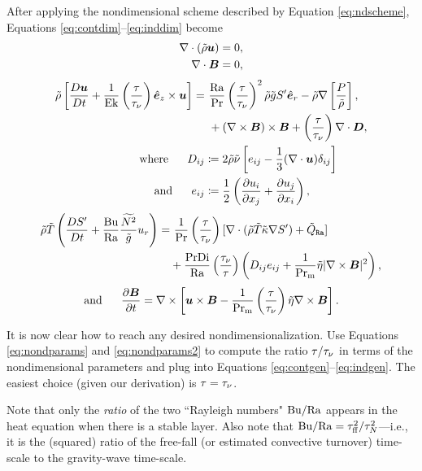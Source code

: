 \documentclass[12pt]{article}
\numberwithin{equation}{section}
\newcommand{\tauovertaunu}{\left(\frac{\tau}{\taunu}\right)}
\begin{document}
	After applying the nondimensional scheme described by Equation \eqref{eq:ndscheme}, Equations \eqref{eq:contdim}--\eqref{eq:inddim} become 
	\begin{align}
	\nabla\cdot(\tilde{\rho}\bm{u}) &= 0\label{eq:contnd},\\
	\nabla\cdot \bm{B} &= 0,
\end{align}
\begin{subequations}\label{eq:momnd}
	\begin{align}
		\rhotilde\left[\matderiv{\vecu}+\frac{1}{\ek}\tauovertaunu\ez\times\vecu\right] = &\ \frac{\ra}{\pr}\left(\frac{\tau}{\taunu}\right)^2\rhotilde\gtilde \entrprime\er         -\rhotilde\nabla\left[ \frac{P}{\rhotilde} \right], \nonumber\\
		&\ +(\curl\vecb)\times\vecb +\tauovertaunu\Div\bm{D},\\
		\where D_{ij} &\define 2\rhotilde\nutilde \left[e_{ij} - \frac{1}{3}(\Div\vecu) \delta_{ij} \right]\\
		\andd e_{ij} &\define \frac{1}{2}\left(\pderiv{u_i}{x_j} + \pderiv{u_j}{x_i} \right),
	\end{align}
\end{subequations}
\begin{align}\label{eq:ennd}
	\rhotilde\tmptilde\left( \matderiv{\entrprime} + \frac{\bu}{\ra}\frac{\nsqtilde}{\gtilde} u_r\right)  = &\ \frac{1}{\pr}\tauovertaunu[\Div(\rhotilde \tmptilde \kappatilde \nabla \entrprime) + \heatra] \nonumber \\
	& + \frac{\pr\di}{\ra}\left(\frac{\taunu}{\tau}\right)\left( D_{ij}e_{ij} + \frac{1}{\prm} \etatilde|\curl\vecb|^2\right),
\end{align}
\begin{align}\label{eq:indnd}
	\andd \pderiv{\vecb}{t} = \curl\left[\vecu\times\vecb - \frac{1}{\prm}\tauovertaunu\etatilde\curl\vecb\right].
\end{align}	

It is now clear how to reach any desired nondimensionalization. Use Equations \eqref{eq:nondparams} and \eqref{eq:nondparams2} to compute the ratio $\tau/\tau_{\nu}$ in terms of the nondimensional parameters and plug into Equations \eqref{eq:contgen}--\eqref{eq:indgen}. The easiest choice (given our derivation) is $\tau=\tau_{\nu}$.

Note that only the \textit{ratio} of the two ``Rayleigh numbers" ${\rm{Bu}}/{\rm{Ra}}$ appears in the heat equation when there is a stable layer. Also note that ${\rm{Bu}}/{\rm{Ra}}=\tau_{\rm ff}^2/\tau_N^2$---i.e., it is the (squared) ratio of the free-fall (or estimated convective turnover) time-scale to the gravity-wave time-scale.  
\end{document}
